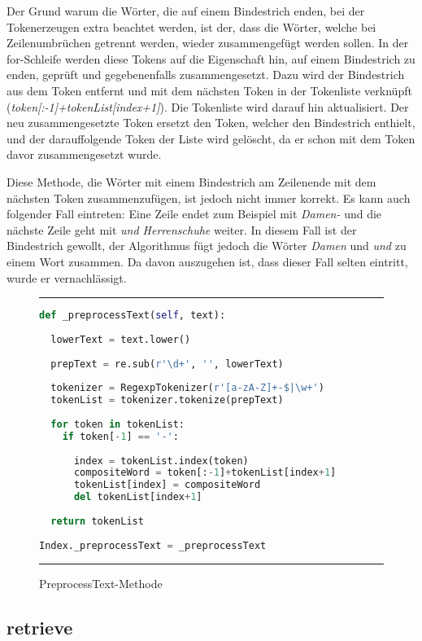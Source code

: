 Der Grund warum die Wörter, die auf einem Bindestrich enden, bei der Tokenerzeugen extra beachtet werden, ist der, dass die Wörter, welche bei Zeilenumbrüchen getrennt werden, wieder zusammengefügt werden sollen. In der for-Schleife werden diese Tokens auf die Eigenschaft hin, auf einem Bindestrich zu enden, geprüft und gegebenenfalls zusammengesetzt. Dazu wird der Bindestrich aus dem Token entfernt und mit dem nächsten Token in der Tokenliste verknüpft (\textit{token[:-1]+tokenList[index+1]}). Die Tokenliste wird darauf hin aktualisiert. Der neu zusammengesetzte Token ersetzt den Token, welcher den Bindestrich enthielt, und der darauffolgende Token der Liste wird gelöscht, da er schon mit dem Token davor zusammengesetzt wurde.

Diese Methode, die Wörter mit einem Bindestrich am Zeilenende mit dem nächsten Token zusammenzufügen, ist jedoch nicht immer korrekt. Es kann auch folgender Fall eintreten: Eine Zeile endet zum Beispiel mit \textit{Damen-} und die nächste Zeile geht mit \textit{und Herrenschuhe} weiter. In diesem Fall ist der Bindestrich gewollt, der Algorithmus fügt jedoch die Wörter \textit{Damen} und \textit{und} zu einem Wort zusammen. Da davon auszugehen ist, dass dieser Fall selten eintritt, wurde er vernachlässigt.

\begin{figure}
	\rule{\textwidth}{0.4pt}
		\begin{lstlisting}[language=Python]
def _preprocessText(self, text):
    
  lowerText = text.lower()
    
  prepText = re.sub(r'\d+', '', lowerText)
            
  tokenizer = RegexpTokenizer(r'[a-zA-Z]+-$|\w+')
  tokenList = tokenizer.tokenize(prepText)
    
  for token in tokenList:
    if token[-1] == '-':
            
      index = tokenList.index(token)
      compositeWord = token[:-1]+tokenList[index+1]
      tokenList[index] = compositeWord
      del tokenList[index+1]
            
  return tokenList
    
Index._preprocessText = _preprocessText
		\end{lstlisting}
	\rule{\textwidth}{0.4pt}
	\caption{PreprocessText-Methode}
	\label{fig:preprocess}
\end{figure}

\subsection{retrieve}\label{retrieve}

